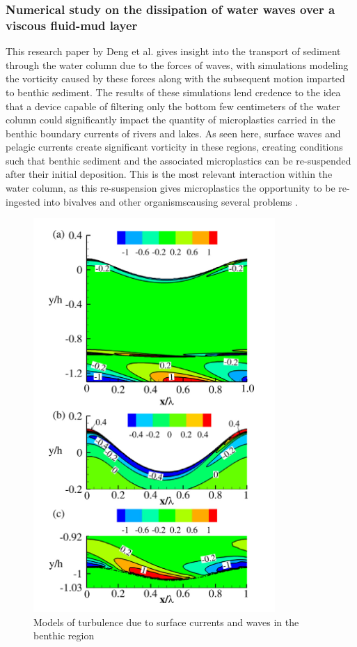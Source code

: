 \documentclass[fleqn,10pt]{SelfArx} %
\begin{document}
	\subsubsection*{Numerical study on the dissipation of water waves over a viscous fluid-mud layer}
	This research paper by Deng et al. gives insight into the transport of sediment through the water column due to the forces of waves, with simulations modeling the vorticity caused by these forces along with the subsequent motion imparted to \gls{benthic} sediment. The results of these simulations lend credence to the idea that a device capable of filtering only the bottom few centimeters of the water column could significantly impact the quantity of microplastics carried in the \gls{benthic} boundary currents of rivers and lakes. As seen here, surface waves and \gls{pelagic} currents create significant vorticity in these regions, creating conditions such that \gls{benthic} sediment and the associated microplastics can be re-suspended after their initial deposition. This is the most relevant interaction within the water column, as this re-suspension gives microplastics the opportunity to be re-ingested into bivalves and other organisms\textemdash causing several problems \cite{Deng_Hu_Guo_Dalrymple_Shen_2017}.
	\begin{figure}[h]
		\centering
		\includegraphics[width=0.5\linewidth]{Figures/RiverTurbulence.png}
		\caption[Benthic Turbulence Models]{Models of turbulence due to surface currents and waves in the \gls{benthic} region}
		\label{fig:TurbulenceBenthic}
	\end{figure}
\end{document}

